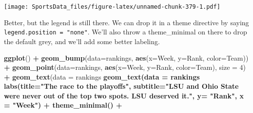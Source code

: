\documentclass[
]{book}
\newenvironment{Shaded}{\begin{snugshade}}{\end{snugshade}}
\newcommand{\DataTypeTok}[1]{\textcolor[rgb]{0.13,0.29,0.53}{#1}}
\newcommand{\DecValTok}[1]{\textcolor[rgb]{0.00,0.00,0.81}{#1}}
\newcommand{\FloatTok}[1]{\textcolor[rgb]{0.00,0.00,0.81}{#1}}
\newcommand{\KeywordTok}[1]{\textcolor[rgb]{0.13,0.29,0.53}{\textbf{#1}}}
\newcommand{\NormalTok}[1]{#1}
\newcommand{\OperatorTok}[1]{\textcolor[rgb]{0.81,0.36,0.00}{\textbf{#1}}}
\newcommand{\StringTok}[1]{\textcolor[rgb]{0.31,0.60,0.02}{#1}}
\begin{document}
\texttt{[image: SportsData\_files/figure-latex/unnamed-chunk-379-1.pdf]}

Better, but the legend is still there. We can drop it in a theme directive by saying \texttt{legend.position\ =\ "none"}. We'll also throw a theme\_minimal on there to drop the default grey, and we'll add some better labeling.

\begin{Shaded}
\begin{Highlighting}[]
\KeywordTok{ggplot}\NormalTok{() }\OperatorTok{+}\StringTok{ }
\StringTok{  }\KeywordTok{geom_bump}\NormalTok{(}\DataTypeTok{data=}\NormalTok{rankings, }\KeywordTok{aes}\NormalTok{(}\DataTypeTok{x=}\NormalTok{Week, }\DataTypeTok{y=}\NormalTok{Rank, }\DataTypeTok{color=}\NormalTok{Team)) }\OperatorTok{+}\StringTok{ }
\StringTok{  }\KeywordTok{geom_point}\NormalTok{(}\DataTypeTok{data=}\NormalTok{rankings, }\KeywordTok{aes}\NormalTok{(}\DataTypeTok{x=}\NormalTok{Week, }\DataTypeTok{y=}\NormalTok{Rank, }\DataTypeTok{color=}\NormalTok{Team), }\DataTypeTok{size =} \DecValTok{4}\NormalTok{) }\OperatorTok{+}\StringTok{   }
\StringTok{  }\KeywordTok{geom_text}\NormalTok{(}\DataTypeTok{data =}\NormalTok{ rankings }\OperatorTok{%
\StringTok{  }\KeywordTok{geom_text}\NormalTok{(}\DataTypeTok{data =}\NormalTok{ rankings }\OperatorTok{%
\StringTok{  }\KeywordTok{labs}\NormalTok{(}\DataTypeTok{title=}\StringTok{"The race to the playoffs"}\NormalTok{, }\DataTypeTok{subtitle=}\StringTok{"LSU and Ohio State were never out of the top two spots. LSU deserved it."}\NormalTok{, }\DataTypeTok{y=} \StringTok{"Rank"}\NormalTok{, }\DataTypeTok{x =} \StringTok{"Week"}\NormalTok{) }\OperatorTok{+}
\StringTok{  }\KeywordTok{theme_minimal}\NormalTok{() }\OperatorTok{+}
}}
\end{Highlighting}
\end{Shaded}
\end{document}
